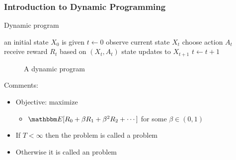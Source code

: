 \begin{frame}
    \frametitle{Introduction to Dynamic Programming}

    Dynamic program

    \begin{algorithm}[H]
      \DontPrintSemicolon
      an initial state $X_0$ is given \;
      $t \leftarrow 0$ \; %
      {
          observe current state $X_t$   \;
          choose action $A_t$ \;
          receive reward $R_t$ based on $(X_t, A_t)$ \;
          state updates to $X_{t+1}$ \;
          $t \leftarrow t + 1$ \;
      }
    \end{algorithm}

\end{frame}

\begin{frame}
    
    \begin{figure}
        \centering
        \vspace{1em}
        \scalebox{0.4}{}
        \vspace{1em}
        \caption{\label{f:state_action_reward} A dynamic program}
    \end{figure}

\end{frame}


\begin{frame}
    
    Comments:
    \begin{itemize}
        \item Objective: maximize 
            \vspace{0.3em}
            \vspace{0.3em}
        \begin{itemize}
            \vspace{0.3em}
            \vspace{0.3em}
            \item \Eg $\EE [ R_0 + \beta R_1 + \beta^2 R_2 + \cdots]$ for
                some $\beta \in (0, 1)$
        \end{itemize}
            \vspace{0.3em}
            \vspace{0.3em}
            \vspace{0.3em}
        \item If $T < \infty$ then the problem is called a  problem  
            \vspace{0.3em}
            \vspace{0.3em}
            \vspace{0.3em}
            \vspace{0.3em}
        \item Otherwise it is called an  problem
    \end{itemize}

\end{frame}


